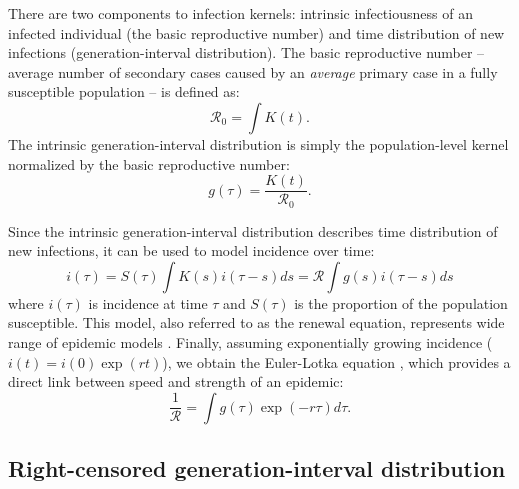 \documentclass[12pt]{article}
\newcommand{\RR}{\ensuremath{{\mathcal R}}}
\begin{document}
There are two components to infection kernels: intrinsic infectiousness of an infected individual (the basic reproductive number) and time distribution of new infections (generation-interval distribution).
The basic reproductive number -- average number of secondary cases caused by an \emph{average} primary case in a fully susceptible population -- is defined as: 
\begin{equation}
\RR_0 = \int K(t).
\end{equation}
The intrinsic generation-interval distribution is simply the population-level kernel normalized by the basic reproductive number:
\begin{equation}
g(\tau) = \frac{K(t)}{\RR_0}.
\end{equation}

Since the intrinsic generation-interval distribution describes time distribution of new infections, it can be used to model incidence over time:
\begin{equation}
i(\tau) = S(\tau) \int K(s) i(\tau-s) ds = \RR \int g(s) i(\tau-s) ds
\end{equation}
where $i(\tau)$ is incidence at time $\tau$ and $S(\tau)$ is the proportion of the population susceptible.
This model, also referred to as the renewal equation, represents wide range of epidemic models \citep{heesterbeek1996concept, diekmann2000mathematical, roberts2004modelling, aldis2005integral, wallinga2007generation, roberts2007model}.
Finally, assuming exponentially growing incidence ($i(t) = i(0) \exp(r t)$), we obtain the Euler-Lotka equation \citep{lotka1907relation}, which provides a direct link between speed and strength of an epidemic:
\begin{equation}
\frac{1}{\RR} = \int g(\tau) \exp(-r \tau) d\tau.
\end{equation}

\subsection{Right-censored generation-interval distribution}
\end{document}
